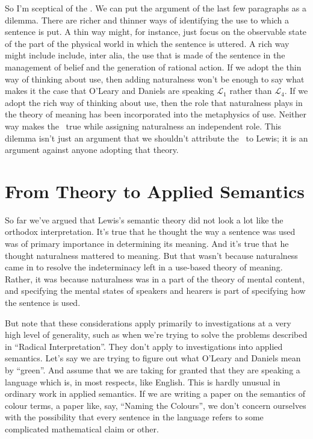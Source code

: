 So I'm sceptical of the \UNT. We can put the argument of the last few paragraphs as a dilemma. There are richer and thinner ways of identifying the use to which a sentence is put. A thin way might, for instance, just focus on the observable state of the part of the physical world in which the sentence is uttered. A rich way might include include, inter alia, the use that is made of the sentence in the management of belief and the generation of rational action. If we adopt the thin way of thinking about use, then adding naturalness won't be enough to say what makes it the case that O'Leary and Daniels are speaking $\mathcal{L}_1$ rather than $\mathcal{L}_4$. If we adopt the rich way of thinking about use, then the role that naturalness plays in the theory of meaning has been incorporated into the metaphysics of use. Neither way makes the \UNT\ true while assigning naturalness an independent role. This dilemma isn't just an argument that we shouldn't attribute the \UNT\ to Lewis; it is an argument against anyone adopting that theory.

\section{From Theory to Applied Semantics}

So far we've argued that Lewis's semantic theory did not look a lot like the orthodox interpretation. It's true that he thought the way a sentence was used was of primary importance in determining its meaning. And it's true that he thought naturalness mattered to meaning. But that wasn't because naturalness came in to resolve the indeterminacy left in a use-based theory of meaning. Rather, it was because naturalness was in a part of the theory of mental content, and specifying the mental states of speakers and hearers is part of specifying how the sentence is used.

But note that these considerations apply primarily to investigations at a very high level of generality, such as when we're trying to solve the problems described in ``Radical Interpretation''. They don't apply to investigations into applied semantics. Let's say we are trying to figure out what O'Leary and Daniels mean by ``green''. And assume that we are taking for granted that they are speaking a language which is, in most respects, like English. This is hardly unusual in ordinary work in applied semantics. If we are writing a paper on the semantics of colour terms, a paper like, say, ``Naming the Colours'',\nocite{Lewis1997c} we don't concern ourselves with the possibility that every sentence in the language refers to some complicated mathematical claim or other.

